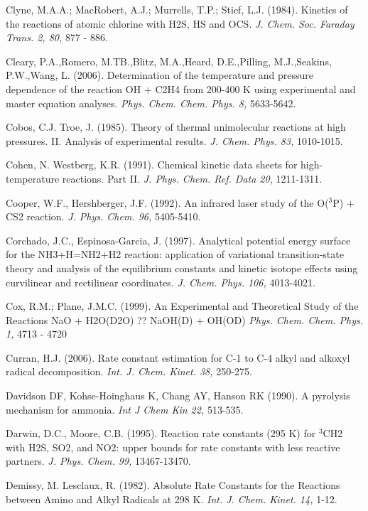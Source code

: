 \documentclass[12pt,landscape]{article}
\newcounter{reaction}
\begin{document}
Clyne, M.A.A.; MacRobert, A.J.; Murrells, T.P.; Stief, L.J. (1984). Kinetics of the reactions of atomic chlorine with H2S, HS and OCS.
{\em J. Chem. Soc. Faraday Trans. 2, 80,} 877 - 886.

Cleary, P.A.,Romero, M.TB.,Blitz, M.A.,Heard, D.E.,Pilling, M.J.,Seakins, P.W.,Wang, L. (2006). Determination of the temperature and pressure dependence of the reaction OH + C2H4 from 200-400 K using experimental and master equation analyses. {\em Phys. Chem. Chem. Phys. 8,} 5633-5642.

Cobos, C.J. Troe, J. (1985). Theory of thermal unimolecular reactions at high pressures. II. Analysis of experimental results. {\em  J. Chem. Phys. 83,} 1010-1015.

Cohen, N. Westberg, K.R. (1991).  Chemical kinetic data sheets for high-temperature reactions. Part II.
{\em J. Phys. Chem. Ref. Data  20,}  1211-1311.

Cooper, W.F., Hershberger, J.F. (1992).  An infrared laser study of the O($^3$P) + CS2 reaction.   {\em J. Phys. Chem. 96,} 5405-5410.

Corchado, J.C., Espinosa-Garcia, J. (1997). Analytical potential energy surface for the NH3+H=NH2+H2 reaction: application of variational transition-state theory and analysis of the equilibrium constants and kinetic isotope effects using curvilinear and rectilinear coordinates. {\em J. Chem. Phys. 106,} 4013-4021.

Cox, R.M.; Plane, J.M.C. (1999). An Experimental and Theoretical Study of the Reactions NaO + H2O(D2O) ?? NaOH(D) + OH(OD)
{\em Phys. Chem. Chem. Phys. 1,} 4713 - 4720

Curran, H.J. (2006). Rate constant estimation for C-1 to C-4 alkyl and alkoxyl radical decomposition.  {\em Int. J. Chem. Kinet. 38,} 250-275.

Davidson DF, Kohse-Hoinghaus K, Chang AY, Hanson RK (1990). A pyrolysis mechanism for ammonia.  {\em Int J Chem Kin 22,} 513-535.

Darwin, D.C., Moore, C.B. (1995).  Reaction rate constants (295 K) for $^3$CH2 with H2S, SO2, and NO2: upper bounds for rate constants with less reactive partners. {\em J. Phys. Chem. 99,} 13467-13470.

Demissy, M. Lesclaux, R. (1982). Absolute Rate Constants for the Reactions between Amino and Alkyl Radicals at 298 K.  {\em Int. J. Chem. Kinet. 14,} 1-12.
\end{document}
